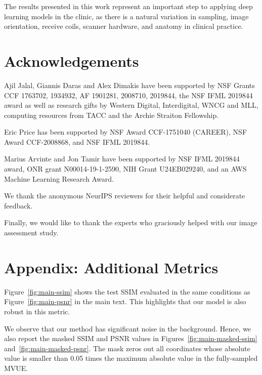 \documentclass{article}
\begin{document}
The results presented in this work represent an important step to applying deep learning models in the clinic, as there is a natural variation in sampling, image orientation, receive coils, scanner hardware, and anatomy in clinical practice. 

\section{Acknowledgements} 
Ajil Jalal, Giannis Daras and Alex Dimakis have been supported by NSF Grants CCF 1763702, 1934932, AF 1901281, 2008710, 2019844, the NSF IFML 2019844 award as well as research gifts by Western Digital, Interdigital, WNCG and MLL, computing resources from TACC and the Archie Straiton Fellowship.

Eric Price has been supported by NSF Award CCF-1751040 (CAREER), NSF Award CCF-2008868, and NSF IFML 2019844.

Marius Arvinte and Jon Tamir have been supported by NSF IFML 2019844 award, ONR grant N00014-19-1-2590, NIH Grant U24EB029240, and an AWS Machine Learning Research Award.

We thank the anonymous NeurIPS reviewers for their helpful and considerate feedback.

Finally, we would like to thank the experts who graciously helped with our image assessment study.





\appendix

\section{Appendix: Additional Metrics}\label{app:metrics}
Figure~\ref{fig:main-ssim} shows the test SSIM evaluated in the same conditions as Figure~\ref{fig:main-psnr} in the main text. This highlights that our model is also robust in this metric.

We observe that our method has significant noise in the background. Hence, we also report the masked SSIM and PSNR values in Figures~\ref{fig:main-masked-ssim} and~\ref{fig:main-masked-psnr}. The mask zeros out all coordinates whose absolute value is smaller than 0.05 times the maximum absolute value in the fully-sampled MVUE.
\end{document}
